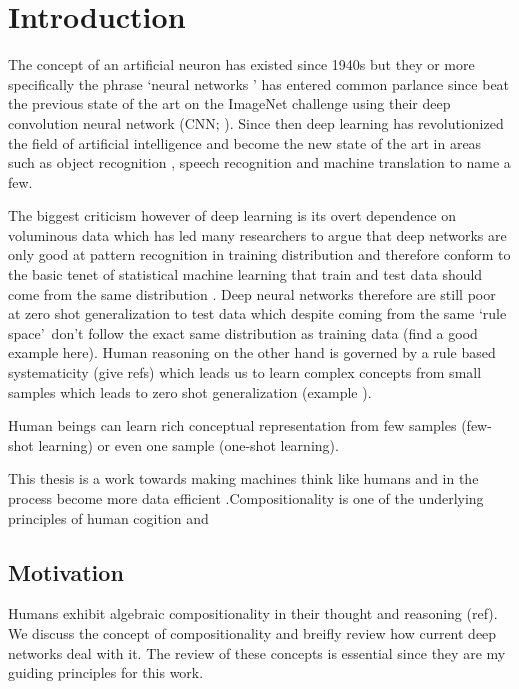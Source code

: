 \chapter{Introduction}
	
The concept of an artificial neuron has existed since 1940s \citep{McCulloch1943} but they or more specifically the phrase \lq neural networks \rq{} has entered common parlance since \cite{Krizhevsky2012} beat the previous state of the art on the ImageNet challenge \citep{Deng2009} using their deep convolution neural network (CNN; \citep{Lecun89}). Since then deep learning has revolutionized the field of artificial intelligence and become the new state of the art in areas such as object recognition \citep{He2015}, speech recognition \citep{Graves2013} and machine translation \citep{Sutskever2014} to name a few.

The biggest criticism however of deep learning is its overt dependence on voluminous data which has led many researchers to argue that deep networks are only good at pattern recognition in training distribution \citep{Marcus2018} and therefore conform to the basic tenet of statistical machine learning that train and test data should come from the same distribution \citep{Zadrozny:2004:LEC:1015330.1015425}. Deep neural networks therefore are still poor at zero shot generalization to test data which despite coming from the same \lq rule space{}\rq\ don't follow the exact same distribution as training data (find a good example here). Human reasoning on the other hand is governed by a rule based systematicity (give refs) which leads us to learn complex concepts from small samples which leads to zero shot generalization (example ).

Human beings can learn rich conceptual representation from few samples (few-shot learning) or even one sample (one-shot learning).

This thesis is a work towards making machines think like humans and in the process become more data  efficient .Compositionality is one of the underlying principles of human cogition and 


\section{Motivation} \label{Chapter:motivation}
Humans exhibit algebraic compositionality in their thought and reasoning (ref). We discuss the concept of compositionality and breifly review how current deep networks deal with it. The review of these concepts is essential since they are my guiding principles for this work.

